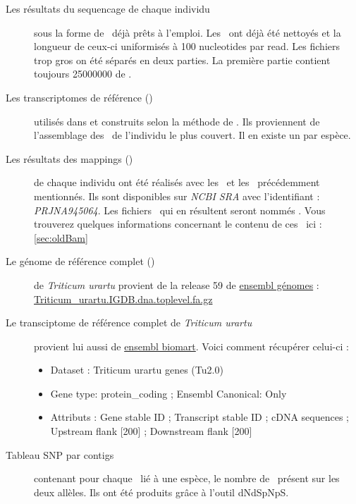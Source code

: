 \documentclass[../main]{subfiles} %
\begin{document}
\begin{description}
    \item[Les résultats du \gls{sequencage} de chaque individu] sous la forme de \fastq déjà prêts à l’emploi. Les \reads ont déjà été nettoyés et la longueur de ceux-ci uniformisés à 100 \glspl{nucleotide} par \gls{read}. Les fichiers trop gros on été séparés en deux parties. La première partie contient toujours \num{25 000 000} de \reads.
    
    \item[Les \glspl{transcriptome} de référence (\TrEx)] utilisés dans \cite{glemin_pervasive_2019} et construits selon la méthode de \cite{sarah_large_2017}. Ils proviennent de l'\gls{assemblage} des \reads de l’individu le plus couvert. Il en existe un par espèce. 

    \item[Les résultats des \glspl{mapping} (\OldBam)]  de chaque individu ont été réalisés avec les \fastq et les \TrEx précédemment mentionnés. Ils sont disponibles sur \textit{NCBI SRA} avec l'identifiant : \textit{PRJNA945064}. Les fichiers \bam qui en résultent seront nommés \OldBam. Vous trouverez quelques informations concernant le contenu de ces \bam ici : \cref{sec:oldBam}

    \item[Le génome de référence complet  (\GeMo)] de \textit{Triticum urartu} provient de la release 59 de \href{https://www.ensembl.org}{ensembl génomes} : \href{https://ftp.ebi.ac.uk/ensemblgenomes/pub/release-59/plants/fasta/triticum_urartu/dna/Triticum_urartu.IGDB.dna.toplevel.fa.gz}{Triticum\_urartu.IGDB.dna.toplevel.fa.gz} 

    \item[Le transciptome de référence complet  de \textit{Triticum urartu}] provient lui aussi de \href{https://www.ensembl.org}{ensembl biomart}. Voici comment récupérer celui-ci :
    \begin{itemize}
        \item Dataset : Triticum urartu genes (Tu2.0)
        \item Gene type: protein\_coding ; Ensembl Canonical: Only
        \item Attributs :  Gene stable ID ; Transcript stable ID ; cDNA sequences ; Upstream flank [200] ; Downstream flank [200]
    \end{itemize}
    
    \item[Tableau SNP par contigs ] contenant pour chaque \contig lié à une espèce, le nombre de \SNP présent sur les deux  
    allèles. Ils ont été produits grâce à l'outil \gls{dNdSpNpS}.


\end{description}
\end{document}
